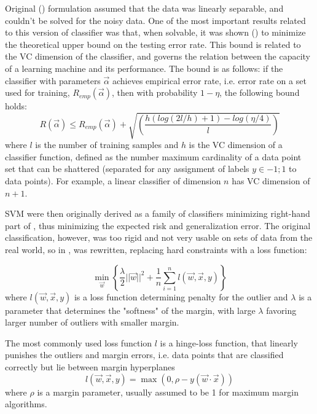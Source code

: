 Original (\cite{vapnik92}) formulation assumed that the data was linearly separable, and couldn't be solved for the noisy data. One of the most important results related to this version of classifier was that, when solvable, it was shown (\cite{Vapnik95})  to minimize the theoretical upper bound on the testing error rate. This bound is related to the VC dimension of the classifier, and  governs the relation between the capacity of a learning machine and its performance. The bound is as follows: if the classifier with parameters $\vec{\alpha}$ achieves empirical error rate, i.e. error rate on a set used for training, $R_{emp}(\vec{\alpha})$, then with probability $1-\eta$, the following bound holds: 
\begin{equation}
\label{VCbound}
R(\vec{\alpha})\le R_{emp}(\vec{\alpha})+\sqrt{\left( \frac{h(log(2l/h)+1)-log(\eta/4)}{l}\right)}
\end{equation}
where $l$ is the number of training samples and $h$ is the VC dimension of a classifier function, defined as the number maximum cardinality of a data point set that can be shattered (separated for any assignment of labels $y\in{-1;1}$ to data points). For example, a linear classifier of dimension $n$ has VC dimension of $n+1$.

SVM were then originally derived as a  family of classifiers minimizing right-hand part of , thus minimizing the expected risk and generalization error. The original classification, however, was too rigid  and not very usable on sets of data from the real world, so in \cite{SVM},  was rewritten,  replacing hard constraints with a loss function:

\begin{equation}
\label{expandedPrimal}
 \min_{\vec{w}} \left\{ \frac{\lambda}{2}||\vec{w}||^2 +\frac{1}{n}\sum_{i=1}^{n}l(\vec{w},\vec{x},y)\right\}
\end{equation}
where $l(\vec{w},\vec{x},y)$ is a loss function determining penalty for the outlier and $\lambda$ is a parameter that determines the "softness" of the margin, with large $\lambda$ favoring larger number of outliers with smaller margin.

The most commonly used loss function $l$ is a hinge-loss function, that linearly punishes the outliers and margin errors, i.e. data points that are classified correctly but lie between margin hyperplanes
\begin{equation}
\label{Hingeloss}
l(\vec{w},\vec{x},y)=\max(0, \rho-y(\vec{w}\cdot\vec{x}))
\end{equation}
where $\rho$ is a margin parameter, usually assumed to be 1 for maximum margin algorithms.

